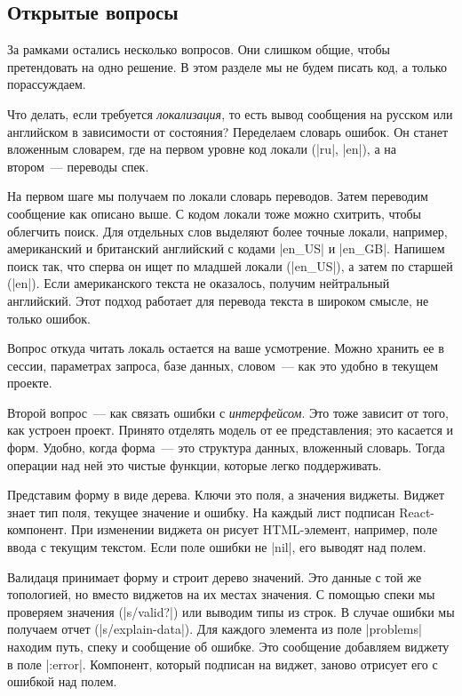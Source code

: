 \subsection{Открытые вопросы}

За рамками остались несколько вопросов. Они слишком общие, чтобы претендовать на
одно решение. В этом разделе мы не будем писать код, а только порассуждаем.

Что делать, если требуется \emph{локализация}, то есть вывод сообщения на русском или
английском в зависимости от состояния? Переделаем словарь ошибок. Он станет
вложенным словарем, где на первом уровне код локали (\spverb|ru|, \spverb|en|),
а на втором~--- переводы спек.

На первом шаге мы получаем по локали словарь переводов. Затем переводим
сообщение как описано выше. С кодом локали тоже можно схитрить, чтобы облегчить
поиск. Для отдельных слов выделяют более точные локали, например, американский и
британский английский с кодами \spverb|en_US| и \spverb|en_GB|. Напишем поиск
так, что сперва он ищет по младшей локали (\spverb|en_US|), а затем по старшей
(\spverb|en|). Если американского текста не оказалось, получим нейтральный
английский. Этот подход работает для перевода текста в широком смысле, не только
ошибок.

Вопрос откуда читать локаль остается на ваше усмотрение. Можно хранить ее в
сессии, параметрах запроса, базе данных, словом~--- как это удобно в текущем
проекте.

Второй вопрос~--- как связать ошибки с \emph{интерфейсом}. Это тоже зависит от того,
как устроен проект. Принято отделять модель от ее представления; это касается и
форм. Удобно, когда форма~--- это структура данных, вложенный словарь.
Тогда операции над ней это чистые функции, которые легко поддерживать.

Представим форму в виде дерева. Ключи это поля, а значения виджеты. Виджет знает
тип поля, текущее значение и ошибку. На каждый лист подписан React-компонент.
При изменении виджета он рисует HTML-элемент, например, поле ввода с текущим текстом.
Если поле ошибки не \spverb|nil|, его выводят над полем.

Валидаця принимает форму и строит дерево значений. Это данные с той же
топологией, но вместо виджетов на их местах значения. С помощью спеки мы
проверяем значения (\spverb|s/valid?|) или выводим типы из строк. В случае
ошибки мы получаем отчет (\spverb|s/explain-data|). Для каждого элемента из поле
\spverb|problems| находим путь, спеку и сообщение об ошибке. Это сообщение
добавляем виджету в поле \spverb|:error|. Компонент, который подписан на виджет,
заново отрисует его с ошибкой над полем.


